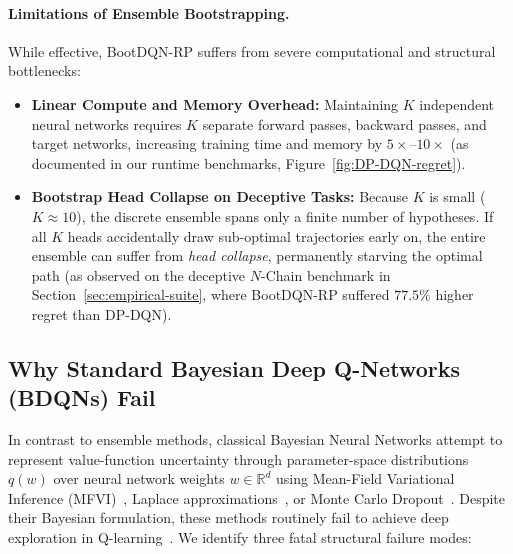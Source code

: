 \documentclass[10pt]{article}
\begin{document}
\paragraph{Limitations of Ensemble Bootstrapping.}
While effective, BootDQN-RP suffers from severe computational and structural bottlenecks:
\begin{itemize}
    \item \textbf{Linear Compute and Memory Overhead:} Maintaining $K$ independent neural networks requires $K$ separate forward passes, backward passes, and target networks, increasing training time and memory by $5\times\text{--}10\times$ (as documented in our runtime benchmarks, Figure~\ref{fig:DP-DQN-regret}).
    \item \textbf{Bootstrap Head Collapse on Deceptive Tasks:} Because $K$ is small ($K \approx 10$), the discrete ensemble spans only a finite number of hypotheses. If all $K$ heads accidentally draw sub-optimal trajectories early on, the entire ensemble can suffer from \emph{head collapse}, permanently starving the optimal path (as observed on the deceptive $N$-Chain benchmark in Section~\ref{sec:empirical-suite}, where BootDQN-RP suffered $77.5\%$ higher regret than DP-DQN).
\end{itemize}

\subsection{Why Standard Bayesian Deep Q-Networks (BDQNs) Fail}
In contrast to ensemble methods, classical Bayesian Neural Networks attempt to represent value-function uncertainty through parameter-space distributions $q(w)$ over neural network weights $w \in \mathbb{R}^d$ using Mean-Field Variational Inference (MFVI)~\citep{blundell2015weight}, Laplace approximations~\citep{mackay2003information}, or Monte Carlo Dropout~\citep{gal2016dropout}. Despite their Bayesian formulation, these methods routinely fail to achieve deep exploration in Q-learning~\citep{osband2018randomized, riquelme2018deep, dwarakanath2020limitations}. We identify three fatal structural failure modes:
\end{document}
